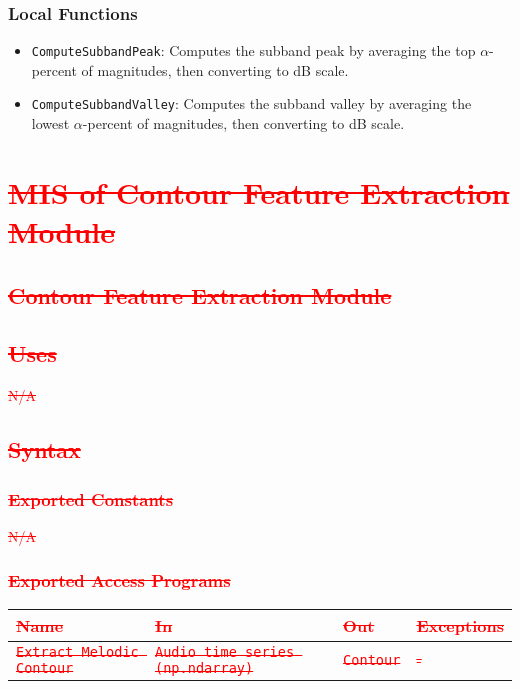 \documentclass[12pt, titlepage]{article}
\begin{document}
{\subsubsection{Local Functions}
\begin{itemize}
    \item \texttt{ComputeSubbandPeak}: Computes the subband peak by averaging the top \(\alpha\)-percent of magnitudes, then converting to dB scale.
    \item \texttt{ComputeSubbandValley}: Computes the subband valley by averaging the lowest \(\alpha\)-percent of magnitudes, then converting to dB scale.
\end{itemize}
}



\section{\textcolor{red}{\sout{MIS of Contour Feature Extraction Module}}} 

\subsection{\textcolor{red}{\sout{Contour Feature Extraction Module}}}

\subsection{\textcolor{red}{\sout{Uses}}}
\textcolor{red}{\sout{N/A}}

\subsection{\textcolor{red}{\sout{Syntax}}}

\subsubsection{\textcolor{red}{\sout{Exported Constants}}}
\textcolor{red}{\sout{N/A}}

\subsubsection{\textcolor{red}{\sout{Exported Access Programs}}}

\begin{center}
\begin{tabular}{p{2cm} p{4cm} p{4cm} p{2cm}}
\hline
\textcolor{red}{\sout{\textbf{Name}}} & \textcolor{red}{\sout{\textbf{In}}} & \textcolor{red}{\sout{\textbf{Out}}} & \textcolor{red}{\sout{\textbf{Exceptions}}}\\
\hline
\textcolor{red}{\sout{\texttt{Extract Melodic Contour}}} & \textcolor{red}{\sout{\texttt{Audio time series (np.ndarray)}}} & \textcolor{red}{\sout{\texttt{Contour}}} & \textcolor{red}{\sout{-}}\\
\hline
\end{tabular}
\end{center}
\end{document}
